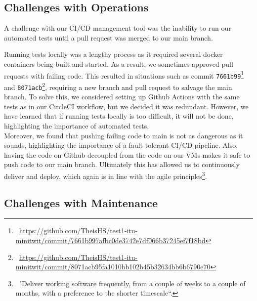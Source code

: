 \subsection{Challenges with Operations}
A challenge with our CI/CD management tool was the inability to run our automated tests until a pull request was merged to our main branch.

Running tests locally was a lengthy process as it required several docker containers being built and started. As a result, we sometimes approved pull requests with failing code. 
This resulted in situations such as commit \texttt{7661b99}\footnote{\ \url{https://github.com/TheisHS/test1-itu-minitwit/commit/7661b997afbc0de3742e7df066b37245ef7f18bd}} and \texttt{8071acb}\footnote{\ \url{https://github.com/TheisHS/test1-itu-minitwit/commit/8071acb95fa1010bb102b45b32634bb6b6790e70}}, requiring a new branch and pull request to salvage the main branch.
To solve this, we considered setting up Github Actions with the same tests as in our CircleCI workflow, but we decided it was redundant.
However, we have learned that if running tests locally is too difficult, it will not be done, highlighting the importance of automated tests.\\ 
Moreover, we found that pushing failing code to main is not as dangerous as it sounds, highlighting the importance of a fault tolerant CI/CD pipeline. Also, having the code on Github decoupled from the code on our VMs makes it safe to push code to our main branch. Ultimately this has allowed us to continuously deliver and deploy, which again is in line with the agile principles\footnote{\ "Deliver working software frequently, from a couple of weeks to a couple of months, with a preference to the shorter timescale``.}.




\subsection{Challenges with Maintenance}
\label{sec:maintenance}

